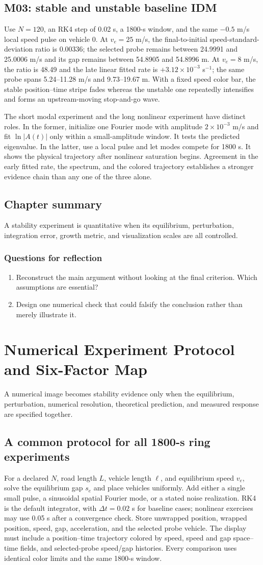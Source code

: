 \documentclass[11pt,a4paper,openany]{book}
\numberwithin{equation}{chapter}
\numberwithin{figure}{chapter}
\numberwithin{table}{chapter}
\newcommand{\chapterguide}[1]{\begin{tcolorbox}[keybox,title=Chapter guide]#1\end{tcolorbox}}
\newcommand{\chapterend}[1]{\section*{Chapter summary}\addcontentsline{toc}{section}{Chapter summary}\begin{tcolorbox}[resultbox]#1\end{tcolorbox}\subsection*{Questions for reflection}\begin{enumerate}[leftmargin=1.7em]\item Reconstruct the main argument without looking at the final criterion. Which assumptions are essential?\item Design one numerical check that could falsify the conclusion rather than merely illustrate it.\end{enumerate}\clearpage}
\begin{document}
\section{M03: stable and unstable baseline IDM}
Use $N=120$, an RK4 step of 0.02 s, a 1800-s window, and the same $-0.5$ m/s local speed pulse on vehicle 0. At $v_e=25$ m/s, the final-to-initial speed-standard-deviation ratio is 0.00336; the selected probe remains between 24.9991 and 25.0006 m/s and its gap remains between 54.8905 and 54.8996 m. At $v_e=8$ m/s, the ratio is 48.49 and the late linear fitted rate is $+3.12\times10^{-3}$ s$^{-1}$; the same probe spans 5.24--11.28 m/s and 9.73--19.67 m. With a fixed speed color bar, the stable position--time stripe fades whereas the unstable one repeatedly intensifies and forms an upstream-moving stop-and-go wave.

The short modal experiment and the long nonlinear experiment have distinct roles. In the former, initialize one Fourier mode with amplitude $2\times10^{-3}$ m/s and fit $\ln|A(t)|$ only within a small-amplitude window. It tests the predicted eigenvalue. In the latter, use a local pulse and let modes compete for 1800 s. It shows the physical trajectory after nonlinear saturation begins. Agreement in the early fitted rate, the spectrum, and the colored trajectory establishes a stronger evidence chain than any one of the three alone.

\chapterend{A stability experiment is quantitative when its equilibrium, perturbation, integration error, growth metric, and visualization scales are all controlled.}

\chapter{Numerical Experiment Protocol and Six-Factor Map}
\chapterguide{A numerical image becomes stability evidence only when the equilibrium, perturbation, numerical resolution, theoretical prediction, and measured response are specified together.}

\section{A common protocol for all 1800-s ring experiments}
For a declared $N$, road length $L$, vehicle length $\ell$, and equilibrium speed $v_e$, solve the equilibrium gap $s_e$ and place vehicles uniformly. Add either a single small pulse, a sinusoidal spatial Fourier mode, or a stated noise realization. RK4 is the default integrator, with $\Delta t=0.02$ s for baseline cases; nonlinear exercises may use 0.05 s after a convergence check. Store unwrapped position, wrapped position, speed, gap, acceleration, and the selected probe vehicle. The display must include a position--time trajectory colored by speed, speed and gap space--time fields, and selected-probe speed/gap histories. Every comparison uses identical color limits and the same 1800-s window.
\end{document}
